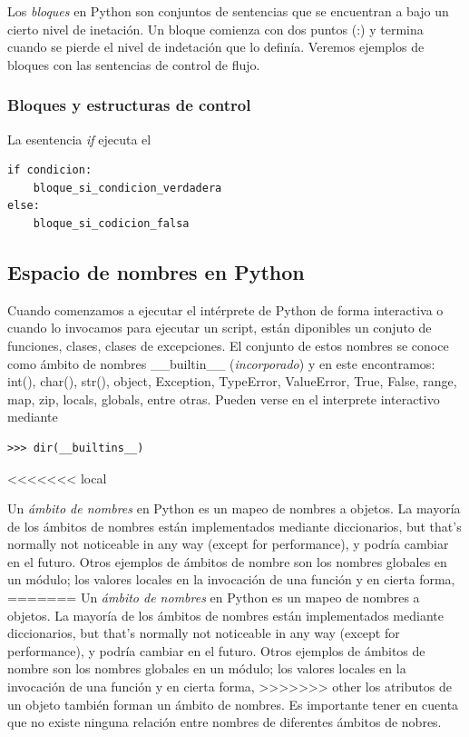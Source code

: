\documentclass[a4paper]{report}
\begin{document}
Los \emph{bloques} en Python son conjuntos de sentencias que se encuentran a 
bajo un cierto nivel de inetación. Un bloque comienza con dos puntos (:)
y termina cuando se pierde el nivel de indetación que lo definía. Veremos
ejemplos de bloques con las sentencias de control de flujo.

\subsubsection*{Bloques y estructuras de control}
La esentencia \emph{if} ejecuta el 
\begin{lstlisting}[style=python]
if condicion:
    bloque_si_condicion_verdadera
else:
    bloque_si_codicion_falsa
\end{lstlisting}

\subsection{Espacio de nombres en Python}
Cuando comenzamos a ejecutar el intérprete de Python de forma interactiva o
cuando
lo invocamos para ejecutar un script, están diponibles un conjuto de funciones,
clases,
clases de excepciones. El conjunto de estos nombres se conoce como ámbito de
nombres 
\_\_builtin\_\_ (\emph{incorporado}) y en este encontramos: int(), char(),
str(), object, 
Exception, TypeError, ValueError, True, False, range, map, zip, locals, globals,
entre otras.
Pueden verse en el interprete interactivo mediante
\begin{verbatim}
>>> dir(__builtins__)
\end{verbatim}


<<<<<<< local

Un \emph{ámbito de nombres} en Python es un mapeo de nombres a objetos. La
mayoría de 
los ámbitos de nombres están implementados mediante diccionarios, but that's
normally not noticeable in any
way (except for performance), y podría cambiar en el futuro. Otros ejemplos de
ámbitos de nombre
son los nombres globales en un módulo; los valores locales en la invocación de
una función y en cierta forma, 
=======
Un \emph{ámbito de nombres} en Python es un mapeo de nombres a objetos. La mayoría de 
los ámbitos de nombres están implementados mediante diccionarios, but that's normally not noticeable in any
way (except for performance), y podría cambiar en el futuro. Otros ejemplos de ámbitos de nombre
son los nombres globales en un módulo; los valores locales en la invocación de una función y en cierta forma, 
>>>>>>> other
los atributos de un objeto también forman un ámbito de nombres.
Es importante tener en cuenta que no existe ninguna relación entre nombres de
diferentes ámbitos de nobres. 
\end{document}
